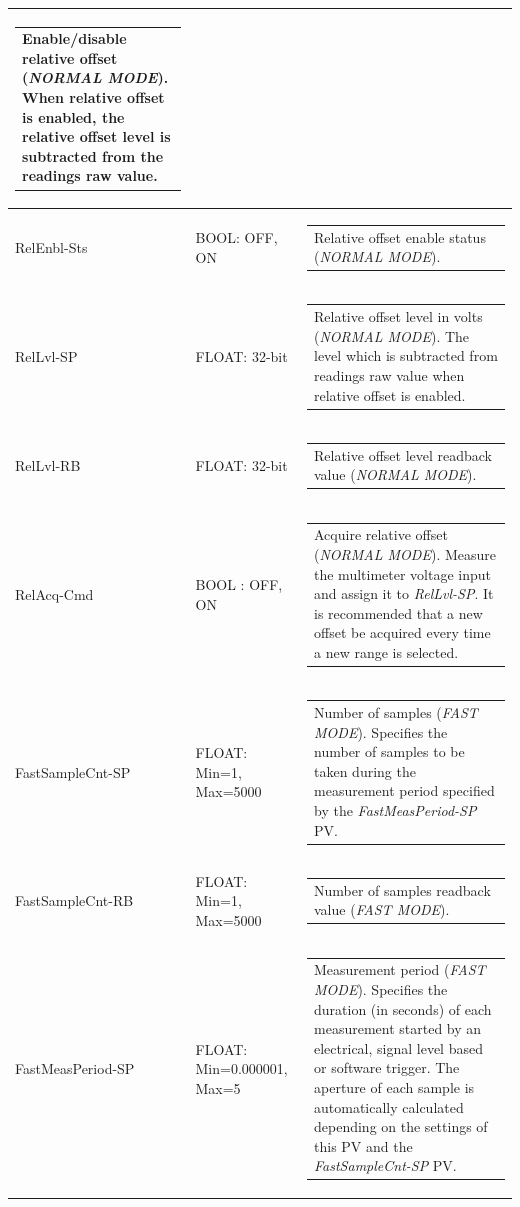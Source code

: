 \documentclass[openany]{article}
\begin{document}
\begin{longtable}{| m{3.0cm} m{4.5cm} m{7.0cm} |}
\begin{tabular}{@{}m{6cm}@{}}
	    					Enable/disable relative offset (\emph{NORMAL MODE}). When relative offset is enabled, the relative offset level is subtracted from the readings raw value.
						\end{tabular} \\ \hline
		RelEnbl-Sts & BOOL: OFF, ON & \begin{tabular}{@{}m{6cm}@{}}
	    					Relative offset enable status (\emph{NORMAL MODE}).
						\end{tabular} \\ \hline
		RelLvl-SP & FLOAT: 32-bit & \begin{tabular}{@{}m{6cm}@{}}
	    					Relative offset level in volts (\emph{NORMAL MODE}). The level which is subtracted from readings raw value when relative offset is enabled.
						\end{tabular} \\ \hline
		RelLvl-RB & FLOAT: 32-bit & \begin{tabular}{@{}m{6cm}@{}}
	    					Relative offset level readback value (\emph{NORMAL MODE}).
						\end{tabular} \\ \hline
		RelAcq-Cmd & BOOL : OFF, ON & \begin{tabular}{@{}m{6cm}@{}}
						Acquire relative offset (\emph{NORMAL MODE}). Measure the multimeter voltage input and assign it to \emph{RelLvl-SP}. It is recommended that a new offset be acquired every time a new range is selected.
						\end{tabular} \\ \hline
		FastSampleCnt-SP & FLOAT: Min=1, Max=5000 & \begin{tabular}{@{}m{6cm}@{}}
	    					Number of samples (\emph{FAST MODE}). Specifies the number of samples to be taken during the measurement period specified by the \emph{FastMeasPeriod-SP} PV.
						\end{tabular} \\ \hline
		FastSampleCnt-RB & FLOAT: Min=1, Max=5000 & \begin{tabular}{@{}m{6cm}@{}}
	    					Number of samples readback value (\emph{FAST MODE}).
						\end{tabular} \\ \hline
		FastMeasPeriod-SP & FLOAT: Min=0.000001, Max=5 & \begin{tabular}{@{}m{6cm}@{}}
	    					Measurement period (\emph{FAST MODE}). Specifies the duration (in seconds) of each measurement started by an electrical, signal level based or software trigger. The aperture of each sample is automatically calculated depending on the settings of this PV and the \emph{FastSampleCnt-SP} PV.

\end{tabular}
\end{longtable}
\end{document}
